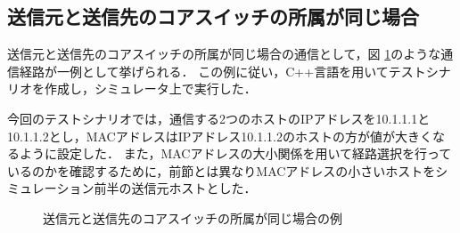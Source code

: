 \subsection{送信元と送信先のコアスイッチの所属が同じ場合}

送信元と送信先のコアスイッチの所属が同じ場合の通信として，図 \ref{fig:4-4}のような通信経路が一例として挙げられる．
この例に従い，C++言語を用いてテストシナリオを作成し，シミュレータ上で実行した．

今回のテストシナリオでは，通信する2つのホストのIPアドレスを10.1.1.1と10.1.1.2とし，MACアドレスはIPアドレス10.1.1.2のホストの方が値が大きくなるように設定した．
また，MACアドレスの大小関係を用いて経路選択を行っているのかを確認するために，前節とは異なりMACアドレスの小さいホストをシミュレーション前半の送信元ホストとした．

\begin{figure}[tb]
	\begin{center}
		\caption{送信元と送信先のコアスイッチの所属が同じ場合の例}
		\label{fig:4-4}
	\end{center}
\end{figure}

